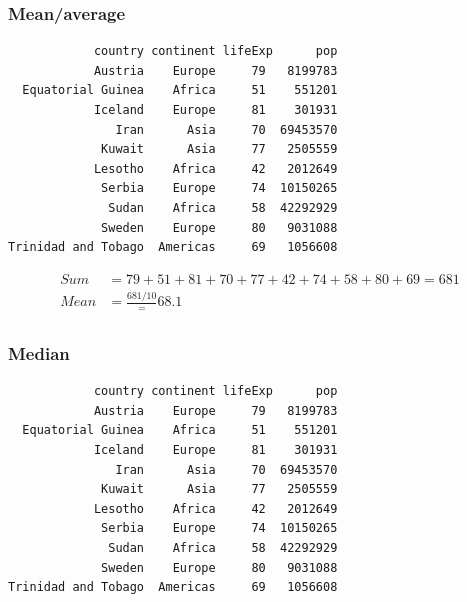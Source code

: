 \documentclass[17pt]{beamer} %
\begin{document}

\begin{frame}[fragile]
\frametitle{Mean/average}
\begin{verbatim}
            country continent lifeExp      pop
            Austria    Europe     79   8199783
  Equatorial Guinea    Africa     51    551201
            Iceland    Europe     81    301931
               Iran      Asia     70  69453570
             Kuwait      Asia     77   2505559
            Lesotho    Africa     42   2012649
             Serbia    Europe     74  10150265
              Sudan    Africa     58  42292929
             Sweden    Europe     80   9031088
Trinidad and Tobago  Americas     69   1056608
\end{verbatim}

\begin{align*}
Sum &= 79 + 51 + 81 + 70 + 77 + 42 + 74 + 58 + 80 + 69 = 681\\
Mean &= \frac{681/10} = 68.1\\
\end{align*}


\end{frame}



\begin{frame}[fragile]
\frametitle{Median}
\begin{verbatim}
            country continent lifeExp      pop
            Austria    Europe     79   8199783
  Equatorial Guinea    Africa     51    551201
            Iceland    Europe     81    301931
               Iran      Asia     70  69453570
             Kuwait      Asia     77   2505559
            Lesotho    Africa     42   2012649
             Serbia    Europe     74  10150265
              Sudan    Africa     58  42292929
             Sweden    Europe     80   9031088
Trinidad and Tobago  Americas     69   1056608
\end{verbatim}
\end{frame}
\end{document}
